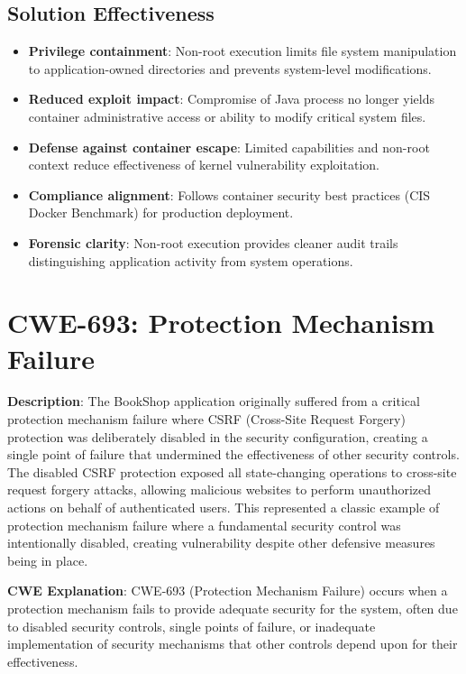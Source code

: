 \documentclass[]{UCD_CS_FYP_Report}
\begin{document}
\subsection*{Solution Effectiveness}
\begin{itemize}
  \item \textbf{Privilege containment}: Non-root execution limits file system manipulation to application-owned directories and prevents system-level modifications.
  \item \textbf{Reduced exploit impact}: Compromise of Java process no longer yields container administrative access or ability to modify critical system files.
  \item \textbf{Defense against container escape}: Limited capabilities and non-root context reduce effectiveness of kernel vulnerability exploitation.
  \item \textbf{Compliance alignment}: Follows container security best practices (CIS Docker Benchmark) for production deployment.
  \item \textbf{Forensic clarity}: Non-root execution provides cleaner audit trails distinguishing application activity from system operations.
\end{itemize}


\section{CWE-693: Protection Mechanism Failure}

\textbf{Description}: The BookShop application originally suffered from a critical protection mechanism failure where CSRF (Cross-Site Request Forgery) protection was deliberately disabled in the security configuration, creating a single point of failure that undermined the effectiveness of other security controls. The disabled CSRF protection exposed all state-changing operations to cross-site request forgery attacks, allowing malicious websites to perform unauthorized actions on behalf of authenticated users. This represented a classic example of protection mechanism failure where a fundamental security control was intentionally disabled, creating vulnerability despite other defensive measures being in place.

\textbf{CWE Explanation}: CWE-693 (Protection Mechanism Failure) occurs when a protection mechanism fails to provide adequate security for the system, often due to disabled security controls, single points of failure, or inadequate implementation of security mechanisms that other controls depend upon for their effectiveness.
\end{document}
